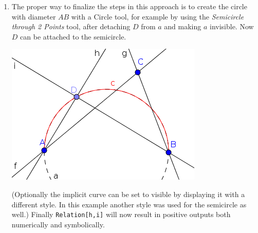 \documentclass{article}
\begin{document}
\begin{enumerate}
\begin{enumerate}
      \item The proper way to finalize the steps in this approach is to create the circle with diameter $AB$ with a Circle tool, for example by using the \textit{Semicircle through 2 Points} tool, after detaching $D$ from $a$ and making $a$ invisible. Now $D$ can be attached to the semicircle.
\begin{center}
\includegraphics[scale=0.5]{limitations-Thales1-3}
\end{center}
      (Optionally the implicit curve can be set to visible by displaying it with a different style. In this example another style was used for the semicircle as well.) Finally \texttt{Relation[h,i]} will now result in positive outputs both numerically and symbolically.
    \end{enumerate}
\end{enumerate}
\end{document}
